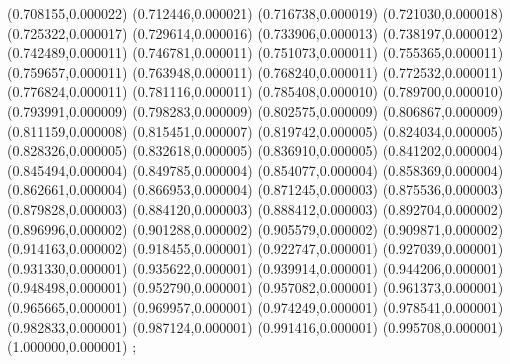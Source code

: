 {(0.708155,0.000022) (0.712446,0.000021) (0.716738,0.000019) (0.721030,0.000018) (0.725322,0.000017) (0.729614,0.000016) (0.733906,0.000013) (0.738197,0.000012) (0.742489,0.000011) (0.746781,0.000011) (0.751073,0.000011) (0.755365,0.000011) (0.759657,0.000011) (0.763948,0.000011) (0.768240,0.000011) (0.772532,0.000011) (0.776824,0.000011) (0.781116,0.000011) (0.785408,0.000010) (0.789700,0.000010) (0.793991,0.000009) (0.798283,0.000009) (0.802575,0.000009) (0.806867,0.000009) (0.811159,0.000008) (0.815451,0.000007) (0.819742,0.000005) (0.824034,0.000005) (0.828326,0.000005) (0.832618,0.000005) (0.836910,0.000005) (0.841202,0.000004) (0.845494,0.000004) (0.849785,0.000004) (0.854077,0.000004) (0.858369,0.000004) (0.862661,0.000004) (0.866953,0.000004) (0.871245,0.000003) (0.875536,0.000003) (0.879828,0.000003) (0.884120,0.000003) (0.888412,0.000003) (0.892704,0.000002) (0.896996,0.000002) (0.901288,0.000002) (0.905579,0.000002) (0.909871,0.000002) (0.914163,0.000002) (0.918455,0.000001) (0.922747,0.000001) (0.927039,0.000001) (0.931330,0.000001) (0.935622,0.000001) (0.939914,0.000001) (0.944206,0.000001) (0.948498,0.000001) (0.952790,0.000001) (0.957082,0.000001) (0.961373,0.000001) (0.965665,0.000001) (0.969957,0.000001) (0.974249,0.000001) (0.978541,0.000001) (0.982833,0.000001) (0.987124,0.000001) (0.991416,0.000001) (0.995708,0.000001) (1.000000,0.000001)
};
    
